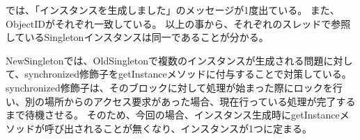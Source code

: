 \documentclass[uplatex]{jsarticle}
\begin{document}
では、「インスタンスを生成しました」のメッセージが1度出ている。
また、ObjectIDがそれぞれ一致している。
以上の事から、それぞれのスレッドで参照しているSingletonインスタンスは同一であることが分かる。

NewSingletonでは、OldSingletonで複数のインスタンスが生成される問題に対して、synchronized修飾子をgetInstanceメソッドに付与することで対策している。
synchronized修飾子は、そのブロックに対して処理が始まった際にロックを行い、別の場所からのアクセス要求があった場合、現在行っている処理が完了するまで待機させる。
そのため、今回の場合、インスタンス生成時にgetInstanceメソッドが呼び出されることが無くなり、インスタンスが1つに定まる。

\end{document}
